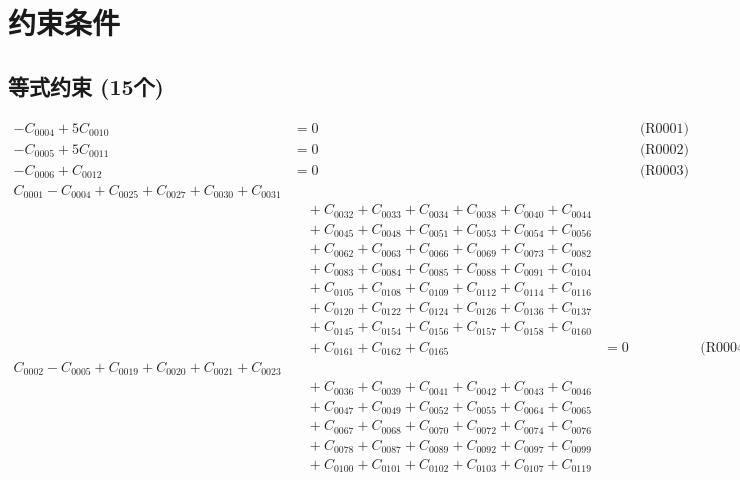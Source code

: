 \documentclass[a4paper,10pt]{article}
\begin{document}
\section{约束条件}

\subsection{等式约束 (15个)}

\allowdisplaybreaks
{\small\begin{align}
-C_{0004} + 5C_{0010} &= 0 && \text{(R0001)} \\
-C_{0005} + 5C_{0011} &= 0 && \text{(R0002)} \\
-C_{0006} + C_{0012} &= 0 && \text{(R0003)} \\
C_{0001} - C_{0004} + C_{0025} + C_{0027} + C_{0030} + C_{0031} \\[0.5ex]
&\quad  + C_{0032} + C_{0033} + C_{0034} + C_{0038} + C_{0040} + C_{0044} \\[0.5ex]
&\quad  + C_{0045} + C_{0048} + C_{0051} + C_{0053} + C_{0054} + C_{0056} \\[0.5ex]
&\quad  + C_{0062} + C_{0063} + C_{0066} + C_{0069} + C_{0073} + C_{0082} \\[0.5ex]
&\quad  + C_{0083} + C_{0084} + C_{0085} + C_{0088} + C_{0091} + C_{0104} \\[0.5ex]
&\quad  + C_{0105} + C_{0108} + C_{0109} + C_{0112} + C_{0114} + C_{0116} \\[0.5ex]
&\quad  + C_{0120} + C_{0122} + C_{0124} + C_{0126} + C_{0136} + C_{0137} \\[0.5ex]
&\quad  + C_{0145} + C_{0154} + C_{0156} + C_{0157} + C_{0158} + C_{0160} \\[0.5ex]
&\quad  + C_{0161} + C_{0162} + C_{0165} &= 0 && \text{(R0004)} \\
C_{0002} - C_{0005} + C_{0019} + C_{0020} + C_{0021} + C_{0023} \\[0.5ex]
&\quad  + C_{0036} + C_{0039} + C_{0041} + C_{0042} + C_{0043} + C_{0046} \\[0.5ex]
&\quad  + C_{0047} + C_{0049} + C_{0052} + C_{0055} + C_{0064} + C_{0065} \\[0.5ex]
&\quad  + C_{0067} + C_{0068} + C_{0070} + C_{0072} + C_{0074} + C_{0076} \\[0.5ex]
&\quad  + C_{0078} + C_{0087} + C_{0089} + C_{0092} + C_{0097} + C_{0099} \\[0.5ex]
&\quad  + C_{0100} + C_{0101} + C_{0102} + C_{0103} + C_{0107} + C_{0119} \\[0.5ex]

\end{align}}
\end{document}
